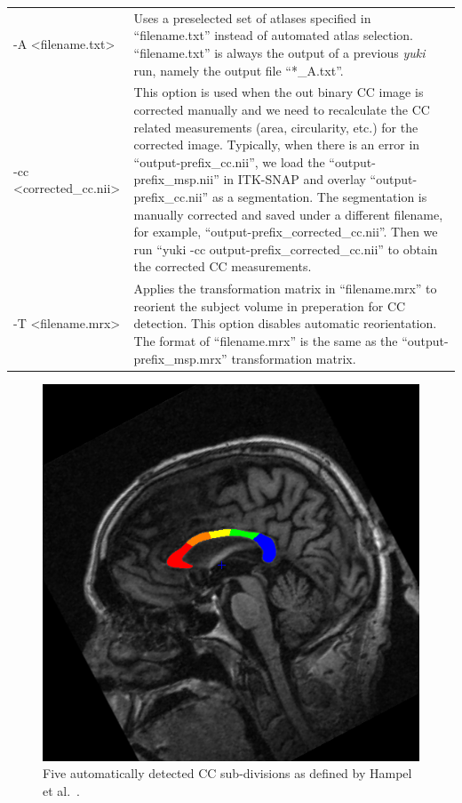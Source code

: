 \documentclass[11pt]{article}
\begin{document}
\begin{longtable}{p{}p{}}
-A \textless filename.txt\textgreater & Uses a preselected set of atlases specified in 
``filename.txt'' instead of automated atlas selection. 
``filename.txt'' is always the output of a previous {\it yuki} run, namely
the output file
``*\_A.txt''. \\ 

-cc \textless corrected\_cc.nii\textgreater & This option is used when the out binary CC 
image is corrected manually and we need to recalculate the CC related measurements 
(area, circularity, etc.) for the corrected image.  Typically, when there is an error
in ``output-prefix\_cc.nii'', we load the
``output-prefix\_msp.nii'' in ITK-SNAP and overlay
``output-prefix\_cc.nii'' as a segmentation.  The segmentation
is manually corrected and saved under a different filename, for example,
``output-prefix\_corrected\_cc.nii''.  Then we run 
``yuki -cc output-prefix\_corrected\_cc.nii'' to obtain the corrected CC measurements.
\\ 

-T \textless filename.mrx\textgreater & Applies the transformation matrix in 
``filename.mrx'' to reorient the subject volume in preperation for CC detection. 
This option disables automatic reorientation. The format of ``filename.mrx'' is 
the same as the ``output-prefix\_msp.mrx'' transformation matrix.\\

\end{longtable}

\begin{figure}[t!]
\begin{center}
\includegraphics[scale=.5]{v1_cc_hampel.jpg}
\caption{Five automatically detected CC sub-divisions as defined by Hampel et al.\ 
\citep{Hampel1998-fz}.
}
\label{fig:hampel}
\end{center}
\end{figure}
\end{document}
